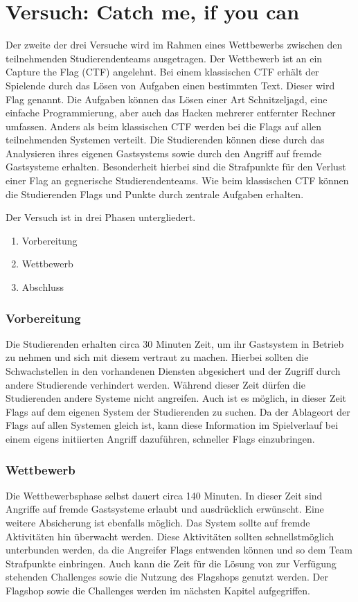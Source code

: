 \section{Versuch: Catch me, if you can}
\label{sec:Versuch}

Der zweite der drei Versuche  wird im Rahmen eines Wettbewerbs zwischen den teilnehmenden Studierendenteams ausgetragen. Der Wettbewerb ist an ein Capture the Flag (CTF) angelehnt. Bei einem klassischen CTF erhält der Spielende durch das Lösen von Aufgaben einen bestimmten Text. Dieser wird Flag genannt. Die Aufgaben können das Lösen einer Art Schnitzeljagd, eine einfache Programmierung, aber auch das Hacken mehrerer entfernter Rechner umfassen. Anders als beim klassischen CTF werden bei  die Flags auf allen teilnehmenden Systemen verteilt. \cite{tanWhatCTFHow2020} Die Studierenden können diese durch das Analysieren ihres eigenen Gastsystems sowie durch den Angriff auf fremde Gastsysteme erhalten. Besonderheit hierbei sind die Strafpunkte für den Verlust einer Flag an gegnerische Studierendenteams. Wie beim klassischen CTF können die Studierenden Flags und Punkte durch zentrale Aufgaben erhalten.

\newpage

Der Versuch ist in drei Phasen untergliedert.
\begin{enumerate}
	\item Vorbereitung
	\item Wettbewerb
	\item Abschluss
\end{enumerate}

\subsubsection{Vorbereitung}
Die Studierenden erhalten circa 30 Minuten Zeit, um ihr Gastsystem in Betrieb zu nehmen und sich mit diesem vertraut zu machen. Hierbei sollten die Schwachstellen in den vorhandenen Diensten abgesichert und der Zugriff durch andere Studierende verhindert werden. Während dieser Zeit dürfen die Studierenden andere Systeme nicht angreifen. Auch ist es möglich, in dieser Zeit Flags auf dem eigenen System der Studierenden zu suchen. Da der Ablageort der Flags auf allen Systemen gleich ist, kann diese Information im Spielverlauf bei einem eigens initiierten Angriff dazuführen, schneller Flags einzubringen.

\subsubsection{Wettbewerb}
Die Wettbewerbsphase selbst dauert circa 140 Minuten. In dieser Zeit sind Angriffe auf fremde Gastsysteme erlaubt und ausdrücklich erwünscht. Eine weitere Absicherung ist ebenfalls möglich. Das System sollte auf fremde Aktivitäten hin überwacht werden. Diese Aktivitäten sollten schnellstmöglich unterbunden werden, da die Angreifer Flags entwenden können und so dem Team Strafpunkte einbringen. Auch kann die Zeit für die Lösung von zur Verfügung stehenden Challenges sowie die Nutzung des Flagshops genutzt werden. Der Flagshop sowie die Challenges werden im nächsten Kapitel aufgegriffen.

